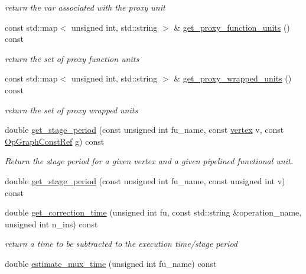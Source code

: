 \begin{DoxyCompactItemize}
\begin{DoxyCompactList}\small\item\em return the var associated with the proxy unit \end{DoxyCompactList}\item 
const std\+::map$<$ unsigned int, std\+::string $>$ \& \hyperlink{classAllocationInformation_ad313cb16811effed12da7bee69c9b16d}{get\+\_\+proxy\+\_\+function\+\_\+units} () const
\begin{DoxyCompactList}\small\item\em return the set of proxy function units \end{DoxyCompactList}\item 
const std\+::map$<$ unsigned int, std\+::string $>$ \& \hyperlink{classAllocationInformation_a60d95218cb3e60000e7a395a30442ba6}{get\+\_\+proxy\+\_\+wrapped\+\_\+units} () const
\begin{DoxyCompactList}\small\item\em return the set of proxy wrapped units \end{DoxyCompactList}\item 
double \hyperlink{classAllocationInformation_ac3fa28933b3a4221c71f233f444479d4}{get\+\_\+stage\+\_\+period} (const unsigned int fu\+\_\+name, const \hyperlink{graph_8hpp_abefdcf0544e601805af44eca032cca14}{vertex} v, const \hyperlink{op__graph_8hpp_a9a0b240622c47584bee6951a6f5de746}{Op\+Graph\+Const\+Ref} g) const
\begin{DoxyCompactList}\small\item\em Return the stage period for a given vertex and a given pipelined functional unit. \end{DoxyCompactList}\item 
double \hyperlink{classAllocationInformation_add4fe4a7eb335ce5e8de39e7637ff791}{get\+\_\+stage\+\_\+period} (const unsigned int fu\+\_\+name, const unsigned int v) const
\item 
double \hyperlink{classAllocationInformation_aac434b4b44cb2d6a383f8a23927f68da}{get\+\_\+correction\+\_\+time} (unsigned int fu, const std\+::string \&operation\+\_\+name, unsigned int n\+\_\+ins) const
\begin{DoxyCompactList}\small\item\em return a time to be subtracted to the execution time/stage period \end{DoxyCompactList}\item 
double \hyperlink{classAllocationInformation_aa0a32dbda0f86f889ed915dfdd3f5686}{estimate\+\_\+mux\+\_\+time} (unsigned int fu\+\_\+name) const

\end{DoxyCompactItemize}
